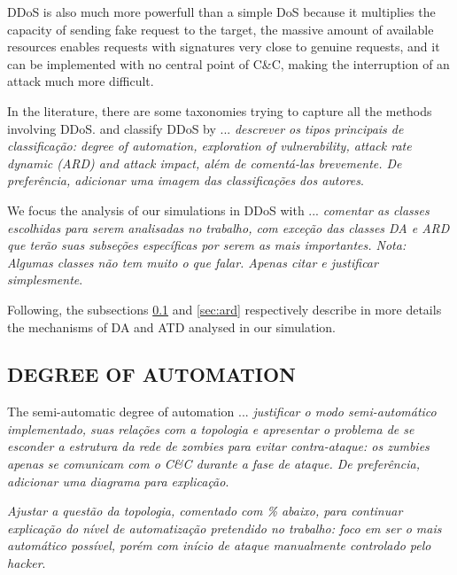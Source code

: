 \documentclass[a4paper,twoside]{article}
\begin{document}
DDoS is also much more powerfull than a simple DoS because it multiplies the capacity of sending fake request to the target, the massive amount of available resources enables requests with signatures very close to genuine requests, and it can be implemented with no central point of C\&C, making the interruption of an attack much more difficult.

In the literature, there are some taxonomies trying to capture all the methods involving DDoS. \cite{Mirkovic:2004} and \cite{Bhardwaj:2016} classify DDoS by ... \emph{descrever os tipos principais de classificação: degree of automation, exploration of vulnerability, attack rate dynamic (ARD) and attack impact, além de comentá-las brevemente. De preferência, adicionar uma imagem das classificações dos autores}.

We focus the analysis of our simulations in DDoS with ... \emph{comentar as classes escolhidas para serem analisadas no trabalho, com exceção das classes DA e ARD que terão suas subseções específicas por serem as mais importantes. Nota: Algumas classes não tem muito o que falar. Apenas citar e justificar simplesmente}.

Following, the subsections \ref{sec:da} and \ref{sec:ard} respectively describe in more details the mechanisms of DA and ATD analysed in our simulation.

\subsection{\uppercase{Degree of automation}} \label{sec:da}

The semi-automatic degree of automation ... \emph{justificar o modo semi-automático implementado, suas relações com a topologia e apresentar o problema de se esconder a estrutura da rede de zombies para evitar contra-ataque: os zumbies apenas se comunicam com o C\&C durante a fase de ataque. De preferência, adicionar uma diagrama para explicação}.

\emph{Ajustar a questão da topologia, comentado com \% abaixo, para continuar explicação do nível de automatização pretendido no trabalho: foco em ser o mais automático possível, porém com início de ataque manualmente controlado pelo hacker}.
\end{document}
